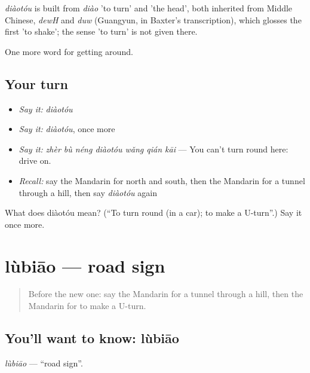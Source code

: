\begin{cousinweb}
\emph{diàotóu} is built from \emph{diào} 'to turn' and  'the head', both inherited from Middle Chinese, \emph{dewH} and \emph{duw} (Guangyun, in Baxter's transcription), which glosses the first 'to shake'; the sense 'to turn' is not given there.
\end{cousinweb}

\begin{grammarlens}[title={What you've built}]
One more word for getting around.
\end{grammarlens}

\subsection*{Your turn}
\begin{itemize}
\raggedright
  \item \emph{Say it:} \emph{diàotóu}
  \item \emph{Say it:} \emph{diàotóu}, once more
  \item \emph{Say it:} \emph{zhèr bù néng diàotóu wǎng qián kāi} — You can't turn round here: drive on.
  \item \emph{Recall:} say the Mandarin for north and south, then the Mandarin for a tunnel through a hill, then say \emph{diàotóu} again
\end{itemize}

\begin{tcolorbox}[breakable,colback=teal!4,colframe=teal!35!black,title={Before you move on}]
What does diàotóu mean? (\textquotedblleft{}To turn round (in a car); to make a U-turn\textquotedblright{}.) Say it once more.
\end{tcolorbox}
\section[lùbiāo]{lùbiāo — road sign}

\label{lesson:ZH-C424-lubiao}



\begin{quote}
Before the new one: say the Mandarin for a tunnel through a hill, then the Mandarin for to make a U-turn.
\end{quote}

\subsection*{You'll want to know: lùbiāo}
\emph{lùbiāo} — \textquotedblleft{}road sign\textquotedblright{}.

